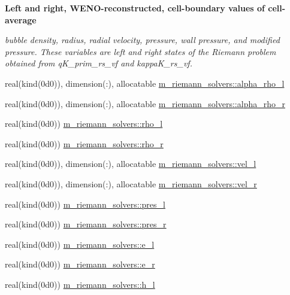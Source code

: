 \begin{Indent}\textbf{ Left and right, W\+E\+N\+O-\/reconstructed, cell-\/boundary values of cell-\/average}\par
{\em bubble density, radius, radial velocity, pressure, wall pressure, and modified pressure. These variables are left and right states of the Riemann problem obtained from q\+K\+\_\+prim\+\_\+rs\+\_\+vf and kappa\+K\+\_\+rs\+\_\+vf. }\begin{DoxyCompactItemize}
\item 
real(kind(0d0)), dimension(\+:), allocatable \hyperlink{namespacem__riemann__solvers_acfbe99c9151b71dadc19e80851d33bfe}{m\+\_\+riemann\+\_\+solvers\+::alpha\+\_\+rho\+\_\+l}
\item 
real(kind(0d0)), dimension(\+:), allocatable \hyperlink{namespacem__riemann__solvers_a2d815c8ccf9b96727876621c46f3da00}{m\+\_\+riemann\+\_\+solvers\+::alpha\+\_\+rho\+\_\+r}
\item 
real(kind(0d0)) \hyperlink{namespacem__riemann__solvers_afc9d9cb504eca33ca970f4340c259161}{m\+\_\+riemann\+\_\+solvers\+::rho\+\_\+l}
\item 
real(kind(0d0)) \hyperlink{namespacem__riemann__solvers_a03542f2527def3010f55cd456ccca698}{m\+\_\+riemann\+\_\+solvers\+::rho\+\_\+r}
\item 
real(kind(0d0)), dimension(\+:), allocatable \hyperlink{namespacem__riemann__solvers_ab17d29f1de63b4669165d7d92f209986}{m\+\_\+riemann\+\_\+solvers\+::vel\+\_\+l}
\item 
real(kind(0d0)), dimension(\+:), allocatable \hyperlink{namespacem__riemann__solvers_a27a761fd83f4f8f7178b8c57b09b825e}{m\+\_\+riemann\+\_\+solvers\+::vel\+\_\+r}
\item 
real(kind(0d0)) \hyperlink{namespacem__riemann__solvers_a81973da2ed5f2e08dd363d889c0e21d7}{m\+\_\+riemann\+\_\+solvers\+::pres\+\_\+l}
\item 
real(kind(0d0)) \hyperlink{namespacem__riemann__solvers_abe054616c664c4f090dfff5ba0aa679d}{m\+\_\+riemann\+\_\+solvers\+::pres\+\_\+r}
\item 
real(kind(0d0)) \hyperlink{namespacem__riemann__solvers_a44eda4124cd70f22697144d295b47009}{m\+\_\+riemann\+\_\+solvers\+::e\+\_\+l}
\item 
real(kind(0d0)) \hyperlink{namespacem__riemann__solvers_a5c08b40ab939ec42b3eb2f50f41a045d}{m\+\_\+riemann\+\_\+solvers\+::e\+\_\+r}
\item 
real(kind(0d0)) \hyperlink{namespacem__riemann__solvers_a075a895b8ab81335f21a168603f29f37}{m\+\_\+riemann\+\_\+solvers\+::h\+\_\+l}

\end{DoxyCompactItemize}
\end{Indent}
